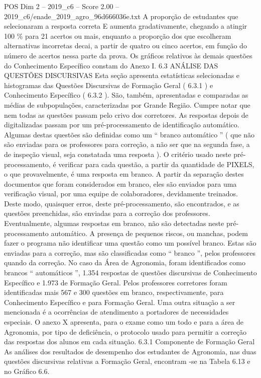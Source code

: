 \begin{textsample}{POS Dim 2 – 2019\_c6 – Score 2.00 – 2019\_c6/enade\_2019\_agro\_96d666036e.txt}
A proporção de estudantes que selecionaram a resposta correta E aumenta gradativamente, chegando a atingir 100 \% para 21 acertos ou mais, enquanto a proporção dos que escolheram alternativas incorretas decai, a partir de quatro ou cinco acertos, em função do número de acertos nessa parte da prova.
Os gráficos relativos às demais questões do Conhecimento Específico constam do Anexo I. 6.3 ANÁLISE DAS QUESTÕES DISCURSIVAS Esta seção apresenta estatísticas selecionadas e histogramas das Questões Discursivas de Formação Geral ( 6.3.1 ) e Conhecimento Específico ( 6.3.2 ).
São, também, apresentadas e comparadas as médias de subpopulações, caracterizadas por Grande Região.
Cumpre notar que nem todas as questões passam pelo crivo dos corretores.
As respostas depois de digitalizadas passam por um pré-processamento de identificação automático.
Algumas destas questões são definidas como um “ branco automático ” ( que não são enviadas para os professores para correção, a não ser que na segunda fase, a de inspeção visual, seja constatada uma resposta ).
O critério usado neste pré-processamento, é verificar para cada questão, a partir da quantidade de PIXELS, o que provavelmente, é uma resposta em branco.
A partir da separação destes documentos que foram considerados em branco, eles são enviados para uma verificação visual, por uma equipe de colaboradores, devidamente treinados.
Deste modo, quaisquer erros, deste pré-processamento, são encontrados, e as questões preenchidas, são enviadas para a correção dos professores.
Eventualmente, algumas respostas em branco, não são detectadas neste pré-processamento automático.
A presença de pequenos riscos, ou manchas, podem fazer o programa não identificar uma questão como um possível branco.
Estas são enviadas para a correção, mas são classificadas como “ branco ”, pelos professores quando da correção.
No caso da Área de Agronomia, foram identificados como brancos “ automáticos ”, 1.354 respostas de questões discursivas de Conhecimento Específico e 1.973 de Formação Geral.
Pelos professores corretores foram identificadas mais 567 e 300 questões em branco, respectivamente, para Conhecimento Específico e para Formação Geral.
Uma outra situação a ser mencionada é a ocorrências de atendimento a portadores de necessidades especiais.
O anexo X apresenta, para o exame como um todo e para a área de Agronomia, por tipo de deficiência, o protocolo usado para permitir a correção das respostas dos alunos em cada situação. 6.3.1 Componente de Formação Geral As análises dos resultados de desempenho dos estudantes de Agronomia, nas duas questões discursivas relativas a Formação Geral, encontram -se na Tabela 6.13 e no Gráfico 6.6.

\end{textsample}
